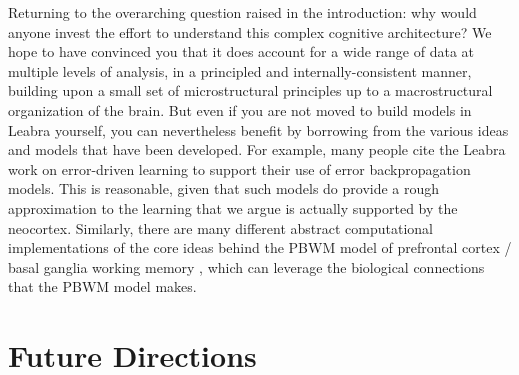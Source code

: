 \documentclass[11pt,twoside]{article}
\begin{document}
Returning to the overarching question raised in the introduction: why would
anyone invest the effort to understand this complex cognitive architecture?
We hope to have convinced you that it does account for a wide range of data at
multiple levels of analysis, in a principled and internally-consistent manner,
building upon a small set of microstructural principles up to a
macrostructural organization of the brain.  But even if you are not moved to
build models in Leabra yourself, you can nevertheless benefit by borrowing
from the various ideas and models that have been developed.  For example, many
people cite the Leabra work on error-driven learning to support their use of
error backpropagation models.  This is reasonable, given that such models do
provide a rough approximation to the learning that we argue is actually
supported by the neocortex.  Similarly, there are many different abstract
computational implementations of the core ideas behind the PBWM model of
prefrontal cortex / basal ganglia working memory \cite{OReillyHerdPauli10},
which can leverage the biological connections that the PBWM model makes.

\section{Future Directions}
\end{document}
